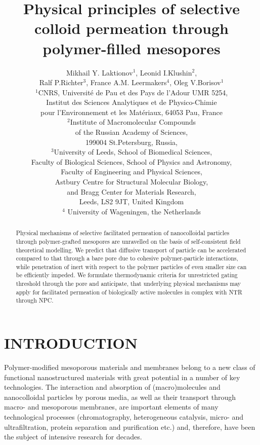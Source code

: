 \documentclass[12pt, a4paper]{article}
\title{Physical principles of selective colloid permeation through polymer-filled mesopores}
\author{Mikhail Y. Laktionov$^1$, Leonid I.Klushin$^{2}$,\\Ralf P.Richter$^3$, France A.M. Leermakers$^4$, Oleg V.Borisov$^1$\\
$^{1}$CNRS, Universit\'e de Pau et des Pays de l'Adour UMR 5254,\\
Institut des Sciences Analytiques et de Physico-Chimie\\
pour l'Environnement et les Mat\'eriaux, 64053 Pau, France \\
$^{2}$Institute of Macromolecular Compounds \\
of the Russian Academy of Sciences, \\
199004 St.Petersburg, Russia,\\
$^{3}$University of Leeds, School of Biomedical Sciences, \\
Faculty of Biological Sciences, 
School of Physics and Astronomy, \\
Faculty of Engineering and Physical Sciences,\\  
Astbury Centre for Structural Molecular Biology,\\ 
and Bragg Center for Materials Research,\\ 
Leeds, LS2 9JT, United Kingdom\\
$^{4}$ University of Wageningen, the Netherlands
}
\begin{document}
\maketitle

\begin{abstract}


Physical mechanisms of selective facilitated permeation of nanocolloidal particles 
through polymer-grafted mesopores are unravelled on the basis of self-consistent field theoretical modelling.
We predict that diffusive transport of particle can be accelerated compared to that through a bare pore due to
cohesive polymer-particle interactions, while penetration of inert with respect to the polymer particles of even smaller size can be 
efficiently impeded. We formulate thermodynamic criteria for unrestricted gating threshold through the pore and anticipate, that underlying
physical mechanisms may apply for facilitated permeation of biologically active molecules in complex with NTR through NPC.   
\end{abstract}

\section{INTRODUCTION}


Polymer-modified mesoporous materials and membranes belong to a new class of functional nanostructured materials with great potential in a number of key technologies. 
The interaction and absorption of (macro)molecules and nanocolloidal particles by porous media, as well as their transport through macro- and mesoporous membranes, 
are important elements of many technological processes (chromatography, heterogeneous catalysis, micro- and ultrafiltration, protein separation and purification etc.) 
and, therefore, have been the subject of intensive research for decades. 
\end{document}
